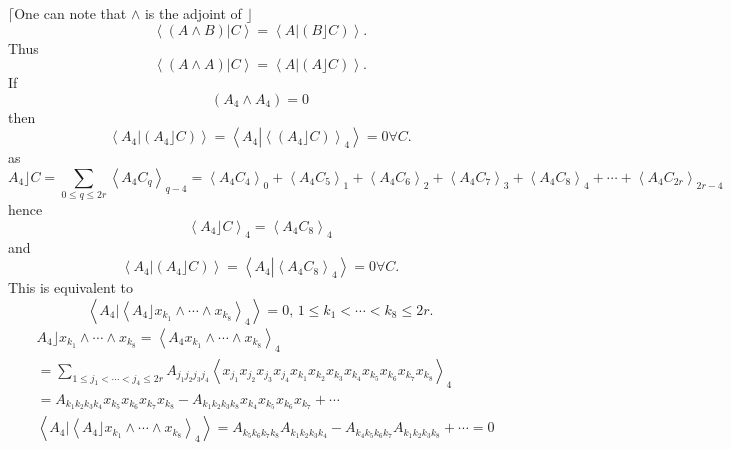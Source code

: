 \documentclass[aps,preprint]{revtex4}%
\begin{document}
$\lceil$One can note that $\wedge$ is the adjoint of $\rfloor$
\begin{equation}
\left\langle \left.  \left(  A\wedge B\right)  \right\vert C\right\rangle
=\left\langle A\left\vert \left(  B\rfloor C\right)  \right.  \right\rangle .
\end{equation}
Thus
\begin{equation}
\left\langle \left.  \left(  A\wedge A\right)  \right\vert C\right\rangle
=\left\langle A\left\vert \left(  A\rfloor C\right)  \right.  \right\rangle .
\end{equation}
If
\begin{equation}
\left(  A_{4}\wedge A_{4}\right)  =0
\end{equation}
then
\begin{equation}
\left\langle \left.  A_{4}\right\vert \left(  A_{4}\rfloor C\right)
\right\rangle =\left\langle A_{4}\left\vert \left\langle \left(  A_{4}\rfloor
C\right)  \right\rangle _{4}\right.  \right\rangle =0\forall C.
\end{equation}
as%
\begin{equation}
A_{4}\rfloor C=\sum_{0\leq q\leq2r}\left\langle A_{4}C_{q}\right\rangle
_{q-4}=\left\langle A_{4}C_{4}\right\rangle _{0}+\left\langle A_{4}%
C_{5}\right\rangle _{1}+\left\langle A_{4}C_{6}\right\rangle _{2}+\left\langle
A_{4}C_{7}\right\rangle _{3}+\left\langle A_{4}C_{8}\right\rangle _{4}%
+\cdots+\left\langle A_{4}C_{2r}\right\rangle _{2r-4}%
\end{equation}
hence
\begin{equation}
\left\langle A_{4}\rfloor C\right\rangle _{4}=\left\langle A_{4}%
C_{8}\right\rangle _{4}%
\end{equation}
and%
\begin{equation}
\left\langle \left.  A_{4}\right\vert \left(  A_{4}\rfloor C\right)
\right\rangle =\left\langle A_{4}\left\vert \left\langle A_{4}C_{8}%
\right\rangle _{4}\right.  \right\rangle =0\forall C.
\end{equation}
This is equivalent to
\begin{equation}
\left\langle \left.  A_{4}\right\vert \left\langle A_{4}\rfloor x_{k_{1}%
}\wedge\cdots\wedge x_{k_{8}}\right\rangle _{4}\right\rangle =0,\,1\leq
k_{1}<\cdots<k_{8}\leq2r.
\end{equation}%
\begin{align}
&  A_{4}\rfloor x_{k_{1}}\wedge\cdots\wedge x_{k_{8}}=\left\langle
A_{4}x_{k_{1}}\wedge\cdots\wedge x_{k_{8}}\right\rangle _{4}\\
&  =\sum_{1\leq j_{1}<\cdots<j_{4}\leq2r}A_{j_{1}j_{2}j_{3}j_{4}}\left\langle
x_{j_{1}}x_{j_{2}}x_{j_{3}}x_{j_{4}}x_{k_{1}}x_{k_{2}}x_{k_{3}}x_{k_{4}%
}x_{k_{5}}x_{k_{6}}x_{k_{7}}x_{k_{8}}\right\rangle _{4}\\
&  =A_{k_{1}k_{2}k_{3}k_{4}}x_{k_{5}}x_{k_{6}}x_{k_{7}}x_{k_{8}}-A_{k_{1}%
k_{2}k_{3}k_{8}}x_{k_{4}}x_{k_{5}}x_{k_{6}}x_{k_{7}}+\cdots\\
&  \left\langle \left.  A_{4}\right\vert \left\langle A_{4}\rfloor x_{k_{1}%
}\wedge\cdots\wedge x_{k_{8}}\right\rangle _{4}\right\rangle =A_{k_{5}%
k_{6}k_{7}k_{8}}A_{k_{1}k_{2}k_{3}k_{4}}-A_{k_{4}k_{5}k_{6}k_{7}}A_{k_{1}%
k_{2}k_{3}k_{8}}+\cdots=0
\end{align}
\end{document}
